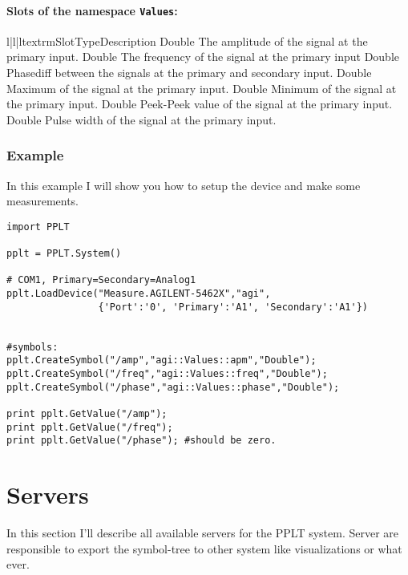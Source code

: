 \paragraph{Slots of the namespace \texttt{Values}:} 
\begin{tableiii}{l|l|l}{textrm}{Slot}{Type}{Description}
        {Double}
        {The amplitude of the signal at the primary input.}
        {Double}
        {The frequency of the signal at the primary input}
        {Double}
        {Phasediff between the signals at the primary and secondary input.}
        {Double}
        {Maximum of the signal at the primary input.}
        {Double}
        {Minimum of the signal at the primary input.}
        {Double}
        {Peek-Peek value of the signal at the primary input.}
        {Double}
        {Pulse width of the signal at the primary input.}
\end{tableiii}        


\subsubsection{Example}
In this example I will show you how to setup the device and make some measurements.
\begin{verbatim}
import PPLT

pplt = PPLT.System()

# COM1, Primary=Secondary=Analog1
pplt.LoadDevice("Measure.AGILENT-5462X","agi",
                {'Port':'0', 'Primary':'A1', 'Secondary':'A1'})


#symbols:
pplt.CreateSymbol("/amp","agi::Values::apm","Double");
pplt.CreateSymbol("/freq","agi::Values::freq","Double");
pplt.CreateSymbol("/phase","agi::Values::phase","Double");

print pplt.GetValue("/amp");
print pplt.GetValue("/freq");
print pplt.GetValue("/phase"); #should be zero.

\end{verbatim}







\section{Servers}
In this section I'll describe all available servers for the PPLT system. 
Server are responsible to export the symbol-tree to other system like 
visualizations or what ever. 

